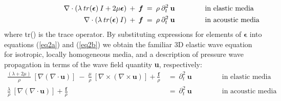 \documentclass{article}
\begin{document}
	\begin{subequations}
		\begin{align}
			\shoveright  \shoveright  \shoveright  \shoveright \shoveright \shoveright  \shoveright  \shoveright   
			\nabla \cdot (\lambda \: tr(\bm{\epsilon}) \: I + 2\mu \bm{\epsilon})  \:	+ \: \bm{f}   \: &= \:  \rho  \: \partial_{t}^{2} \: \mathbf{u} \: \quad \quad \quad \quad \text{in elastic media} 
			\label{eq2a} \\		
			\shoveright  \shoveright  \shoveright  \shoveright \shoveright \shoveright  \shoveright   \shoveright  				   
			\nabla \cdot (\lambda \: tr(\bm{\epsilon}) \: I ) 	\:	+ \: \bm{f} 				   \: &= \:  \rho  \: \partial_{t}^{2} \: \mathbf{u} \: \quad \quad \quad \quad \text{in acoustic media} 
			\label{eq2b}
		\end{align}
	\end{subequations} %
	where tr() is the trace operator. By substituting expressions for elements of $\bm{\epsilon}$ into equations (\ref{eq2a}) and (\ref{eq2b}) we obtain the familiar 3D elastic wave equation for isotropic, locally homogeneous media, and a description of pressure wave propagation in terms of the wave field quantity \textbf{u}, respectively:
	\begin{subequations}
		\begin{align}
			\frac{(\lambda + 2\mu)}{\rho} \: [\nabla (\nabla \cdot \bm{u})] \: - \: \frac{\mu}{\rho} \:[\nabla \times (\nabla \times \bm{u})]  +\frac{\bm{f}}{\rho}	\: &= \: \partial_{t}^{2} \: \mathbf{u} \: \quad \quad \quad \quad \text{in elastic media}
			\label{eq3a}   \\
			\frac{\lambda}{\rho} \: [\nabla (\nabla \cdot \bm{u})] +\frac{\bm{f}}{\rho}  \: &= \: \partial_{t}^{2} \: \mathbf{u} \:  \quad \quad \quad \quad \text{in acoustic media} 
			\label{eq3b} 
		\end{align} 
	\end{subequations} %
\end{document}
